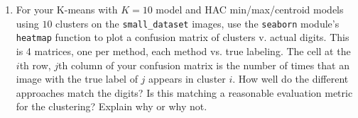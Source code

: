 \documentclass[submit]{harvardml}
\begin{document}
\begin{problem}
\begin{enumerate}
\item For your K-means with $K = 10$ model and HAC min/max/centroid models using $10$ clusters on the \texttt{small\_dataset} images, use the \texttt{seaborn} module's \texttt{heatmap} function to plot a confusion matrix of clusters v. actual digits. This is 4 matrices, one per method, each method vs. true labeling. The cell at the $i$th row, $j$th column of your confusion matrix is the number of times that an image with the true label of $j$ appears in cluster $i$. How well do the different approaches match the digits? Is this matching a reasonable evaluation metric for the clustering?  Explain why or why not.   
  
\end{enumerate}

\end{problem}
\end{document}
